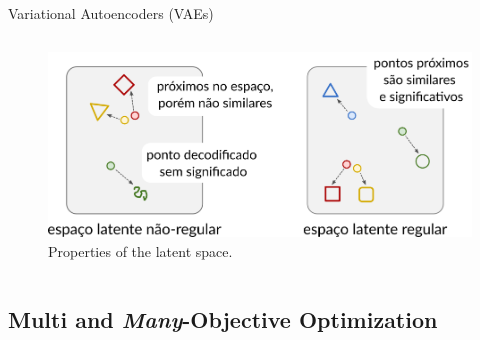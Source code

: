 \documentclass[aspectratio=169,xcolor=dvipsnames]{beamer}
\begin{document}
\begin{frame}{Variational Autoencoders (VAEs)}
\begin{columns}[t]
        \begin{figure}
            \centering
            \includegraphics[width=0.9\linewidth]{imgs/latent-space-properties.png}
            \caption{Properties of the latent space.}
        \end{figure}

    \end{columns}
\end{frame}




\subsection{Multi and \textit{Many}-Objective Optimization}

\end{document}
